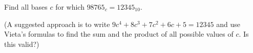 Find all bases $c$ for which $98765_c=12345_{10}$.

(A suggested approach is to write $9c^4+8c^3+7c^2+6c+5=12345$ and use Vieta's formulas to find the sum and the product of all possible values of $c$. Is this valid?)
